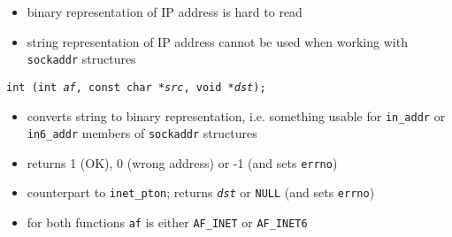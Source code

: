 

\begin{slide}
\begin{itemize}
\item binary representation of IP address is hard to read
\item string representation of IP address cannot be used when working with
\texttt{sockaddr} structures
\end{itemize}

\texttt{int (int \emph{af}, const char *\emph{src},
void *\emph{dst});}
\begin{itemize}
\item converts string to binary representation, i.e. something usable for
\texttt{in\_addr} or \texttt{in6\_addr} members of \texttt{sockaddr} structures
\item returns 1 (OK), 0 (wrong address) or -1 (and sets \texttt{errno})
\end{itemize}

\begin{itemize}
\item counterpart to \texttt{inet\_pton}; returns \emph{\texttt{dst}} or
\texttt{NULL} (and sets \texttt{errno})
\end{itemize}
\begin{itemize}
\item for both functions \texttt{af} is either \texttt{AF\_INET} or
\texttt{AF\_INET6}
\end{itemize}
\end{slide}

\label{IPv4_IPv6_ADDRESSES}

